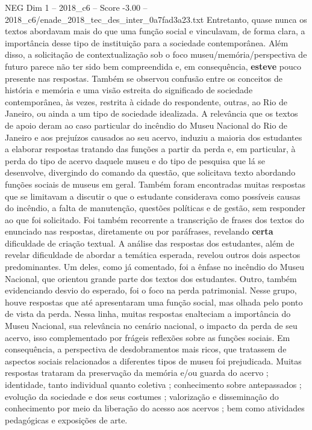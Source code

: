 \begin{textsample}{NEG Dim 1 – 2018\_c6 – Score -3.00 – 2018\_c6/enade\_2018\_tec\_des\_inter\_0a7fad3a23.txt}
Entretanto, quase nunca os textos abordavam mais do que uma função social e vinculavam, de forma clara, a importância desse tipo de instituição para a sociedade contemporânea.
Além disso, a solicitação de contextualização sob o foco museu/memória/perspectiva de futuro parece não ter sido bem compreendida e, em consequência, \textbf{esteve} pouco presente nas respostas.
Também se observou confusão entre os conceitos de história e memória e uma visão estreita do significado de sociedade contemporânea, às vezes, restrita à cidade do respondente, outras, ao Rio de Janeiro, ou ainda a um tipo de sociedade idealizada.
A relevância que os textos de apoio deram ao caso particular do incêndio do Museu Nacional do Rio de Janeiro e aos prejuízos causados ao seu acervo, induziu a maioria dos estudantes a elaborar respostas tratando das funções a partir da perda e, em particular, à perda do tipo de acervo daquele museu e do tipo de pesquisa que lá se desenvolve, divergindo do comando da questão, que solicitava texto abordando funções sociais de museus em geral.
Também foram encontradas muitas respostas que se limitavam a discutir o que o estudante considerava como possíveis causas do incêndio, a falta de manutenção, questões políticas e de gestão, sem responder ao que foi solicitado.
Foi também recorrente a transcrição de frases dos textos do enunciado nas respostas, diretamente ou por paráfrases, revelando \textbf{certa} dificuldade de criação textual.
A análise das respostas dos estudantes, além de revelar dificuldade de abordar a temática esperada, revelou outros dois aspectos predominantes.
Um deles, como já comentado, foi a ênfase no incêndio do Museu Nacional, que orientou grande parte dos textos dos estudantes.
Outro, também evidenciando desvio do esperado, foi o foco na perda patrimonial.
Nesse grupo, houve respostas que até apresentaram uma função social, mas olhada pelo ponto de vista da perda.
Nessa linha, muitas respostas enalteciam a importância do Museu Nacional, sua relevância no cenário nacional, o impacto da perda de seu acervo, isso complementado por frágeis reflexões sobre as funções sociais.
Em consequência, a perspectiva de desdobramentos mais ricos, que tratassem de aspectos sociais relacionados a diferentes tipos de museu foi prejudicada.
Muitas respostas trataram da preservação da memória e/ou guarda do acervo ; identidade, tanto individual quanto coletiva ; conhecimento sobre antepassados ; evolução da sociedade e dos seus costumes ; valorização e disseminação do conhecimento por meio da liberação do acesso aos acervos ; bem como atividades pedagógicas e exposições de arte.

\end{textsample}
